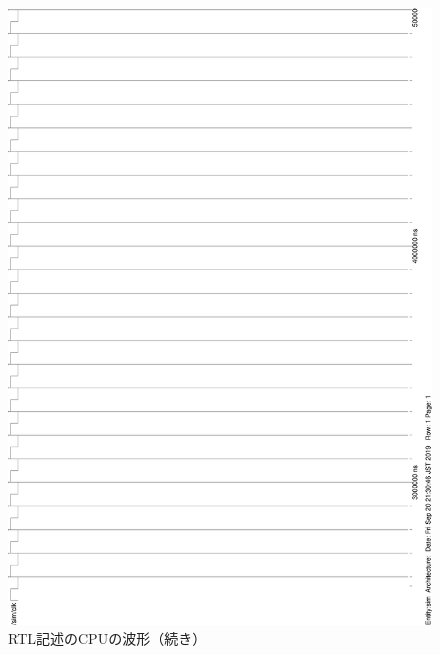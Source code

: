 \documentclass[a4j]{jarticle}
\begin{document}
\begin{figure}[p]
    \vspace*{-20mm}
    \begin{center}
        \includegraphics[height=\textheight]{wave-rtl2.eps}\\[10mm]
        RTL記述のCPUの波形（続き）
    \end{center}
\end{figure}
\end{document}

